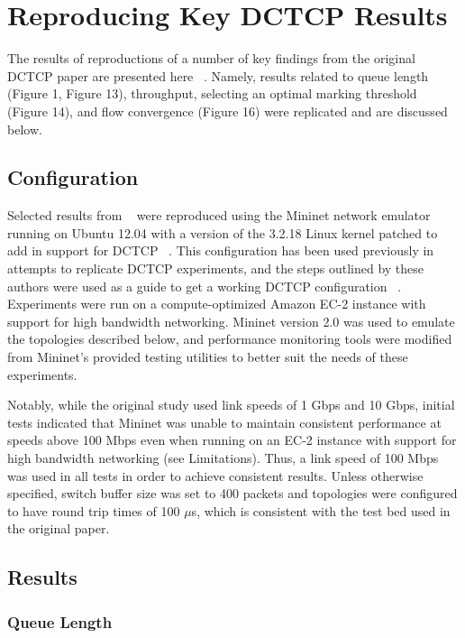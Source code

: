 \section{Reproducing Key DCTCP Results}

The results of reproductions of a number of key findings from the original DCTCP paper are presented here ~\cite{alizadeh_data_2010}. Namely, results related to queue length (Figure 1, Figure 13), throughput, selecting an optimal marking threshold (Figure 14), and flow convergence (Figure 16) were replicated and are discussed below.  

\subsection{Configuration}

Selected results from ~\cite{alizadeh_data_2010} were reproduced using the Mininet network emulator running on Ubuntu 12.04 with a version of the 3.2.18 Linux kernel patched to add in support for DCTCP ~\cite{mininet_team_mininet:_2014}. This configuration has been used previously in attempts to replicate DCTCP experiments, and the steps outlined by these authors were used as a guide to get a working DCTCP configuration ~\cite{raghaven_cs244_2013}. Experiments were run on a compute-optimized Amazon EC-2 instance with support for high bandwidth networking. Mininet version 2.0 was used to emulate the topologies described below, and performance monitoring tools were modified from Mininet's provided testing utilities to better suit the needs of these experiments.

Notably, while the original study used link speeds of 1 Gbps and 10 Gbps, initial tests indicated that Mininet was unable to maintain consistent performance at speeds above 100 Mbps even when running on an EC-2 instance with support for high bandwidth networking (see Limitations). Thus, a link speed of 100 Mbps was used in all tests in order to achieve consistent results. Unless otherwise specified, switch buffer size was set to 400 packets and topologies were configured to have round trip times of 100 $\mu$s, which is consistent with the test bed used in the original paper.

\subsection{Results}

\subsubsection{Queue Length}

